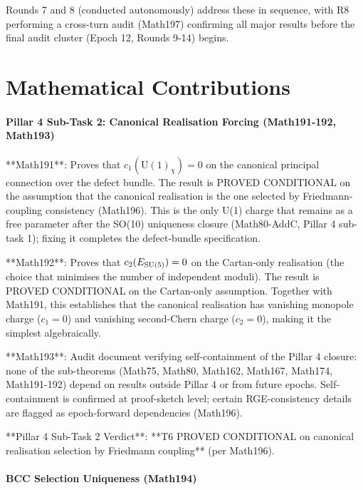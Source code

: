 Rounds 7 and 8 (conducted autonomously) address these in sequence, with R8
performing a cross-turn audit (Math197) confirming all major results before the
final audit cluster (Epoch 12, Rounds 9-14) begins.

\section{Mathematical Contributions}

\paragraph{Pillar 4 Sub-Task 2: Canonical Realisation Forcing (Math191-192, Math193)}

**Math191**: Proves that $c_1(\mathrm{U}(1)_\chi) = 0$ on the canonical principal
connection over the defect bundle. The result is PROVED CONDITIONAL on the
assumption that the canonical realisation is the one selected by Friedmann-coupling
consistency (Math196). This is the only U(1) charge that remains as a free parameter
after the SO(10) uniqueness closure (Math80-AddC, Pillar 4 sub-task 1); fixing it
completes the defect-bundle specification.

**Math192**: Proves that $c_2(E_{\rm SU(5)}) = 0$ on the Cartan-only realisation
(the choice that minimises the number of independent moduli). The result is PROVED
CONDITIONAL on the Cartan-only assumption. Together with Math191, this establishes
that the canonical realisation has vanishing monopole charge ($c_1 = 0$) and vanishing
second-Chern charge ($c_2 = 0$), making it the simplest algebraically.

**Math193**: Audit document verifying self-containment of the Pillar 4 closure: none
of the sub-theorems (Math75, Math80, Math162, Math167, Math174, Math191-192) depend
on results outside Pillar 4 or from future epochs. Self-containment is confirmed at
proof-sketch level; certain RGE-consistency details are flagged as epoch-forward
dependencies (Math196).

**Pillar 4 Sub-Task 2 Verdict**: **T6 PROVED CONDITIONAL on canonical realisation
selection by Friedmann coupling** (per Math196).

\paragraph{BCC Selection Uniqueness (Math194)}

